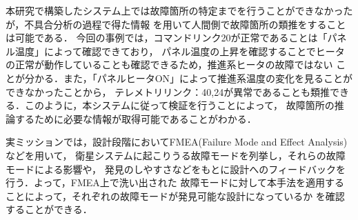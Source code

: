 \documentclass[11pt]{jsreport}
\begin{document}
本研究で構築したシステム上では故障箇所の特定までを行うことができなかったが，不具合分析の過程で得た情報
を用いて人間側で故障箇所の類推をすることは可能である．
今回の事例では，コマンドリンク20が正常であることは「パネル温度」によって確認できており，
パネル温度の上昇を確認することでヒータの正常が動作していることも確認できるため，推進系ヒータの故障ではない
ことが分かる．また，「パネルヒータON」によって推進系温度の変化を見ることができなかったことから，
テレメトリリンク：40,24が異常であることも類推できる．このように，本システムに従って検証を行うことによって，
故障箇所の推論するために必要な情報が取得可能であることがわかる．

実ミッションでは，設計段階においてFMEA(Failure Mode and Effect Analysis)などを用いて，
衛星システムに起こりうる故障モードを列挙し，それらの故障モードによる影響や，
発見のしやすさなどをもとに設計へのフィードバックを行う．よって，FMEA上で洗い出された
故障モードに対して本手法を適用することによって，それぞれの故障モードが発見可能な設計になっているか
を確認することができる．
\end{document}
